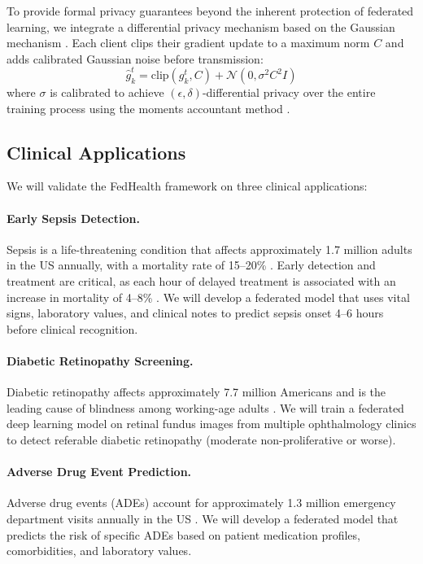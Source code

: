 \documentclass[12pt,letterpaper]{article}
\begin{document}
To provide formal privacy guarantees beyond the inherent protection of federated learning, we integrate a differential privacy mechanism based on the Gaussian mechanism \citep{Dwork2014}. Each client clips their gradient update to a maximum norm $C$ and adds calibrated Gaussian noise before transmission:
\begin{equation}
\hat{g}_k^t = \text{clip}(g_k^t, C) + \mathcal{N}(0, \sigma^2 C^2 I)
\label{eq:dp}
\end{equation}
where $\sigma$ is calibrated to achieve $(\epsilon, \delta)$-differential privacy over the entire training process using the moments accountant method \citep{Abadi2016}.

\subsection{Clinical Applications}

We will validate the FedHealth framework on three clinical applications:

\paragraph{Early Sepsis Detection.} Sepsis is a life-threatening condition that affects approximately 1.7 million adults in the US annually, with a mortality rate of 15--20\% \citep{CDC2020}. Early detection and treatment are critical, as each hour of delayed treatment is associated with an increase in mortality of 4--8\% \citep{Kumar2006}. We will develop a federated model that uses vital signs, laboratory values, and clinical notes to predict sepsis onset 4--6 hours before clinical recognition.

\paragraph{Diabetic Retinopathy Screening.} Diabetic retinopathy affects approximately 7.7 million Americans and is the leading cause of blindness among working-age adults \citep{NEI2020}. We will train a federated deep learning model on retinal fundus images from multiple ophthalmology clinics to detect referable diabetic retinopathy (moderate non-proliferative or worse).

\paragraph{Adverse Drug Event Prediction.} Adverse drug events (ADEs) account for approximately 1.3 million emergency department visits annually in the US \citep{CDC2018}. We will develop a federated model that predicts the risk of specific ADEs based on patient medication profiles, comorbidities, and laboratory values.
\end{document}
